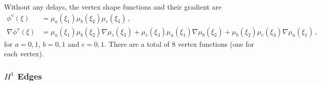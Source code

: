 Without any delays, the vertex shape functions and their gradient are
\begin{equation}
	\begin{aligned}
		\phi^\mathrm{v}(\xi)&=\mu_a(\xi_1)\mu_b(\xi_2)\mu_c(\xi_3)\,,\\
		\nabla\phi^\mathrm{v}(\xi)&=\mu_a(\xi_1)\mu_b(\xi_2)\nabla\mu_c(\xi_3)+\mu_c(\xi_3)\mu_a(\xi_1)\nabla\mu_b(\xi_2)
			+\mu_b(\xi_2)\mu_c(\xi_3)\nabla\mu_a(\xi_1)\,,
	\end{aligned}
\end{equation}
for $a=0,1$, $b=0,1$ and $c=0,1$. 
There are a total of $8$ vertex functions (one for each vertex).

%

\subsubsection{\texorpdfstring{$H^1$}{H1} Edges}

